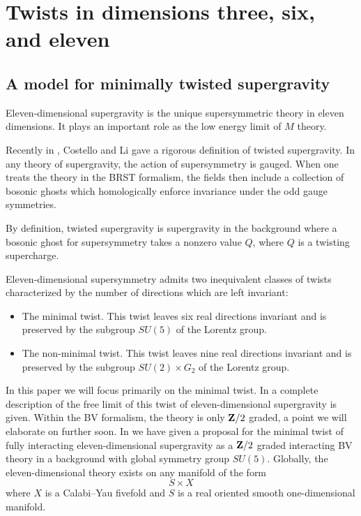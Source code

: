 %

%
%
%

\newcommand{\thfd}{\Bar{D}}
\newcommand{\thfdel}{D} 

\section{Twists in dimensions three, six, and eleven}

\subsection{A model for minimally twisted supergravity}

Eleven-dimensional supergravity is the unique supersymmetric theory in eleven dimensions.
It plays an important role as the low energy limit of $M$ theory.

Recently in \cite{CLsugra}, Costello and Li gave a rigorous definition of twisted supergravity.
In any theory of supergravity, the action of supersymmetry is gauged. When one treats the theory in the BRST formalism, the fields then include a collection of bosonic ghosts which homologically enforce invariance under the odd gauge symmetries.

By definition, twisted supergravity is supergravity in the background where a bosonic ghost for supersymmetry takes a nonzero value $Q$, where $Q$ is a twisting supercharge.

Eleven-dimensional supersymmetry admits two inequivalent classes of twists characterized by the number of directions which are left invariant:
\begin{itemize}
\item 
The minimal twist. 
This twist leaves six real directions invariant and is preserved by the subgroup $SU(5)$ of the Lorentz group. 
\item 
The non-minimal twist. 
This twist leaves nine real directions invariant and is preserved by the subgroup $SU(2) \times G_2$ of the Lorentz group. 
\end{itemize}

In this paper we will focus primarily on the minimal twist. 
In \cite{SWspinor} a complete description of the free limit of this twist of eleven-dimensional supergravity is given.
Within the BV formalism, the theory is only $\mathbf{Z}/2$ graded, a point we will elaborate on further soon. 
In \cite{RSW} we have given a proposal for the minimal twist of fully interacting eleven-dimensional supergravity as a $\mathbf{Z}/2$ graded interacting BV theory in a background with global symmetry group $SU(5)$.
Globally, the eleven-dimensional theory exists on any manifold of the form 
\[
S \times X 
\] 
where $X$ is a Calabi--Yau fivefold and $S$ is a real oriented smooth one-dimensional manifold.


